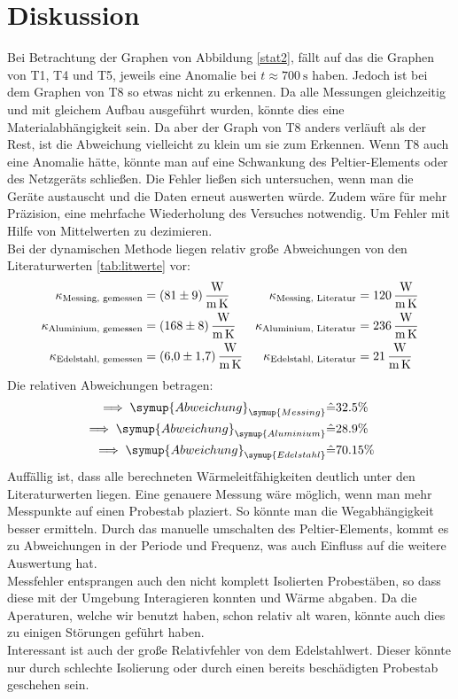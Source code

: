 \section{Diskussion}
\label{sec:Diskussion}
Bei Betrachtung der Graphen von Abbildung \ref{stat2}, fällt auf das die Graphen von T1, T4 und T5, jeweils eine Anomalie bei $t \approx \SI{700}{\second}$ haben.
Jedoch ist bei dem Graphen von T8 so etwas nicht zu erkennen. Da alle Messungen gleichzeitig und mit gleichem Aufbau ausgeführt wurden, 
könnte dies eine Materialabhängigkeit sein. Da aber der Graph von T8 anders verläuft als der Rest, ist die Abweichung vielleicht zu klein um sie zum Erkennen.
Wenn T8 auch eine Anomalie hätte, könnte man auf eine Schwankung des Peltier-Elements oder des Netzgeräts schließen.
Die Fehler ließen sich untersuchen, wenn man die Geräte austauscht und die Daten erneut auswerten würde. 
Zudem wäre für mehr Präzision, eine mehrfache Wiederholung des Versuches notwendig. Um Fehler mit Hilfe von Mittelwerten zu dezimieren.
\\
Bei der dynamischen Methode liegen relativ große Abweichungen von den Literaturwerten \ref{tab:litwerte} vor:
\begin{align*}
    \kappa_\text{Messing, gemessen} &= \SI{81 \pm 9}{\watt\per\metre\per\kelvin} & \kappa_\text{Messing, Literatur} &= \SI{120}{\watt\per\metre\per\kelvin}\\
    \kappa_\text{Aluminium, gemessen} &= \SI{168 \pm 8}{\watt\per\metre\per\kelvin} & \kappa_\text{Aluminium, Literatur} &= \SI{236}{\watt\per\metre\per\kelvin}\\
    \kappa_\text{Edelstahl, gemessen} &= \SI{6 \pm 1.7}{\watt\per\metre\per\kelvin} & \kappa_\text{Edelstahl, Literatur} &= \SI{21}{\watt\per\metre\per\kelvin}
\end{align*}
Die relativen Abweichungen betragen:
\begin{align*}
    \implies \symup{Abweichung}_{\symup{Messing}} &\hat{=} 32.5 \%\\
    \implies \symup{Abweichung}_{\symup{Aluminium}} &\hat{=} 28.9\%\\
    \implies \symup{Abweichung}_{\symup{Edelstahl}} &\hat{=} 70.15 \%
\end{align*}
Auffällig ist, dass alle berechneten Wärmeleitfähigkeiten deutlich unter den Literaturwerten liegen.
Eine genauere Messung wäre möglich, wenn man mehr Messpunkte auf einen Probestab plaziert. So könnte man die Wegabhängigkeit besser ermitteln.
Durch das manuelle umschalten des Peltier-Elements, kommt es zu Abweichungen in der Periode und Frequenz, was auch Einfluss auf die weitere Auswertung hat.
\\
Messfehler entsprangen auch den nicht komplett Isolierten Probestäben, so dass diese mit der Umgebung Interagieren konnten und Wärme abgaben.
Da die Aperaturen, welche wir benutzt haben, schon relativ alt waren, könnte auch dies zu einigen Störungen geführt haben.
\\
Interessant ist auch der große Relativfehler von dem Edelstahlwert. Dieser könnte nur durch schlechte Isolierung oder durch einen bereits beschädigten Probestab geschehen sein.


